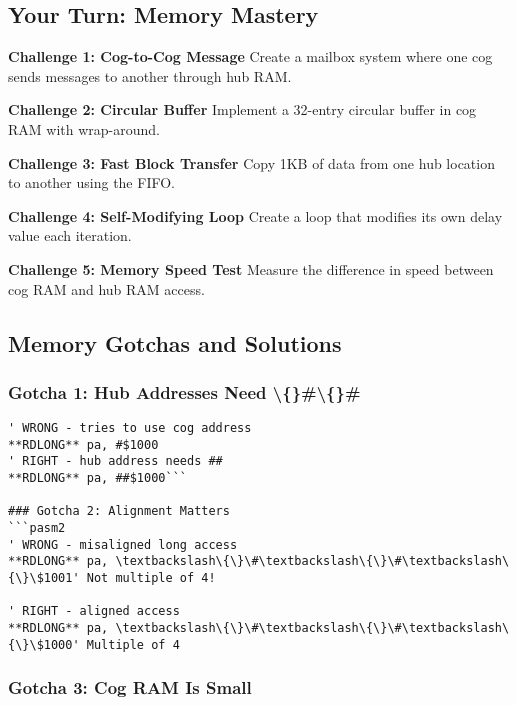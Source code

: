 \documentclass[11pt]{book}
\begin{document}
\hypertarget{your-turn-memory-mastery}{%
\subsection{Your Turn: Memory Mastery}\label{your-turn-memory-mastery}}

\begin{yourturn}
\textbf{Challenge 1: Cog-to-Cog Message}
Create a mailbox system where one cog sends messages to another through hub RAM.

\textbf{Challenge 2: Circular Buffer}
Implement a 32-entry circular buffer in cog RAM with wrap-around.

\textbf{Challenge 3: Fast Block Transfer}
Copy 1KB of data from one hub location to another using the FIFO.

\textbf{Challenge 4: Self-Modifying Loop}
Create a loop that modifies its own delay value each iteration.

\textbf{Challenge 5: Memory Speed Test}
Measure the difference in speed between cog RAM and hub RAM access.
\end{yourturn}

\hypertarget{memory-gotchas-and-solutions}{%
\subsection{Memory Gotchas and
Solutions}\label{memory-gotchas-and-solutions}}

\hypertarget{gotcha-1-hub-addresses-need}{%
\subsubsection{\texorpdfstring{Gotcha 1: Hub Addresses Need
\textbackslash\{\}\#\textbackslash\{\}\#}{Gotcha 1: Hub Addresses Need \{\}\#\{\}\#}}\label{gotcha-1-hub-addresses-need}}

\begin{lstlisting}
' WRONG - tries to use cog address
**RDLONG** pa, #$1000        
' RIGHT - hub address needs ##
**RDLONG** pa, ##$1000```

### Gotcha 2: Alignment Matters
```pasm2
' WRONG - misaligned long access
**RDLONG** pa, \textbackslash\{\}\#\textbackslash\{\}\#\textbackslash\{\}\$1001' Not multiple of 4!
        
' RIGHT - aligned access
**RDLONG** pa, \textbackslash\{\}\#\textbackslash\{\}\#\textbackslash\{\}\$1000' Multiple of 4
\end{lstlisting}

\hypertarget{gotcha-3-cog-ram-is-small}{%
\subsubsection{Gotcha 3: Cog RAM Is
Small}\label{gotcha-3-cog-ram-is-small}}
\end{document}
